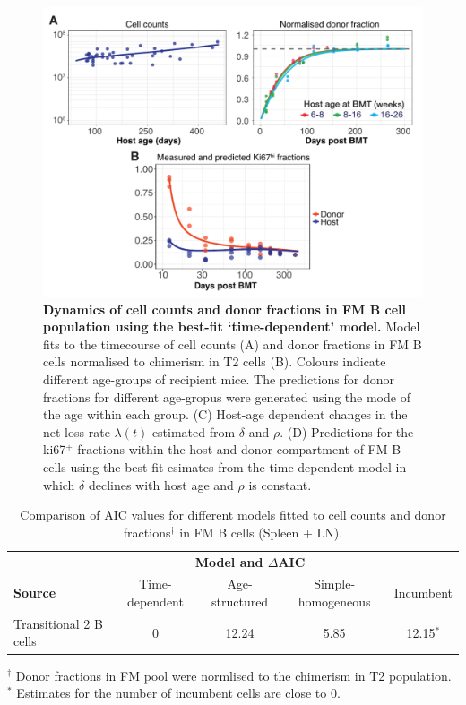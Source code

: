 \documentclass[11.5pt]{article}
\begin{document}
\begin{figure}[h!]
	\centerline{\includegraphics[scale = 0.9] {Results_FM.pdf}}
	\caption{\small \textbf{Dynamics of cell counts and donor fractions in FM B cell population using the best-fit `time-dependent' model.}  Model fits to the timecourse of cell counts (A) and donor fractions in FM B cells normalised to chimerism in T2 cells (B). Colours indicate different age-groups of recipient mice. The predictions for donor fractions for different age-gropus were generated using the  mode of the age within each group. (C) Host-age dependent changes in the net loss rate $\lambda(t)$ estimated from $\delta$ and $\rho$. (D) Predictions for the ki67$^+$ fractions within the host and donor compartment of FM B cells using the best-fit esimates from the time-dependent model in which $\delta$ declines with host age and $\rho$ is constant.}
	\label{fig:results_FM}
\end{figure}


\clearpage

\begin{table}[h!]
	\begin{center}
		\renewcommand{\arraystretch}{1.25}
		\begin{tabular}{ l c c c c} 
			\toprule 
			& \multicolumn{3}{c}{\textbf{Model and $\Delta$AIC}} \\
			\cline{2-5}
			\textbf{Source}  &  {\small Time-dependent}  &  {\small Age-structured} & {\small Simple-homogeneous} & {\small Incumbent} \\ 
			\toprule
			Transitional 2 B cells      & 0      &  12.24 & 5.85 & 12.15$^\ast$  \\ 
			\hline
			\toprule 
		\end{tabular}
	\end{center}
	\caption{\small Comparison of AIC values for different models fitted to cell counts and donor fractions$^{\dagger}$ in FM B cells (Spleen + LN).}
	$^{\dagger}$ \footnotesize{Donor fractions in FM pool were normlised to the chimerism in T2 population. }\\
	$^\ast$ \footnotesize{Estimates for the number of incumbent cells are close to 0.}
	\label{tab:FM-AICs}
\end{table} 
\end{document}
